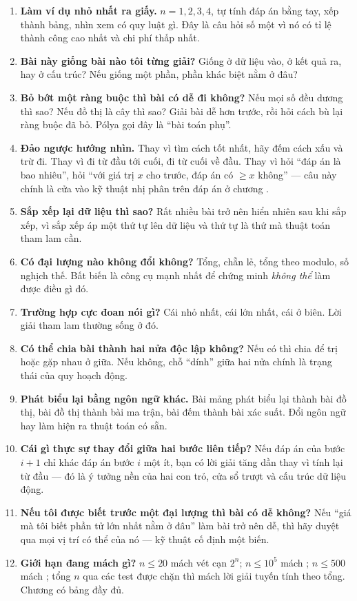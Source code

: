 \documentclass[../../algorithm.tex]{subfiles}
\begin{document}
\begin{enumerate}
\item \textbf{Làm ví dụ nhỏ nhất ra giấy.} \(n=1,2,3,4\), tự tính đáp án bằng tay, xếp thành bảng, nhìn xem có quy luật gì. Đây là câu hỏi số một vì nó có tỉ lệ thành công cao nhất và chi phí thấp nhất.
\item \textbf{Bài này giống bài nào tôi từng giải?} Giống ở dữ liệu vào, ở kết quả ra, hay ở cấu trúc? Nếu giống một phần, phần khác biệt nằm ở đâu?
\item \textbf{Bỏ bớt một ràng buộc thì bài có dễ đi không?} Nếu mọi số đều dương thì sao? Nếu đồ thị là cây thì sao? Giải bài dễ hơn trước, rồi hỏi cách bù lại ràng buộc đã bỏ. Pólya gọi đây là ``bài toán phụ''.
\item \textbf{Đảo ngược hướng nhìn.} Thay vì tìm cách tốt nhất, hãy đếm cách xấu và trừ đi. Thay vì đi từ đầu tới cuối, đi từ cuối về đầu. Thay vì hỏi ``đáp án là bao nhiêu'', hỏi ``với giá trị \(x\) cho trước, đáp án có \(\ge x\) không'' --- câu này chính là cửa vào kỹ thuật nhị phân trên đáp án ở chương .
\item \textbf{Sắp xếp lại dữ liệu thì sao?} Rất nhiều bài trở nên hiển nhiên sau khi sắp xếp, vì sắp xếp áp một thứ tự lên dữ liệu và thứ tự là thứ mà thuật toán tham lam cần.
\item \textbf{Có đại lượng nào không đổi không?} Tổng, chẵn lẻ, tổng theo modulo, số nghịch thế. Bất biến là công cụ mạnh nhất để chứng minh \emph{không thể} làm được điều gì đó.
\item \textbf{Trường hợp cực đoan nói gì?} Cái nhỏ nhất, cái lớn nhất, cái ở biên. Lời giải tham lam thường sống ở đó.
\item \textbf{Có thể chia bài thành hai nửa độc lập không?} Nếu có thì chia để trị hoặc gặp nhau ở giữa. Nếu không, chỗ ``dính'' giữa hai nửa chính là trạng thái của quy hoạch động.
\item \textbf{Phát biểu lại bằng ngôn ngữ khác.} Bài mảng phát biểu lại thành bài đồ thị, bài đồ thị thành bài ma trận, bài đếm thành bài xác suất. Đổi ngôn ngữ hay làm hiện ra thuật toán có sẵn.
\item \textbf{Cái gì thực sự thay đổi giữa hai bước liên tiếp?} Nếu đáp án của bước \(i+1\) chỉ khác đáp án bước \(i\) một ít, bạn có lời giải tăng dần thay vì tính lại từ đầu --- đó là ý tưởng nền của hai con trỏ, cửa sổ trượt và cấu trúc dữ liệu động.
\item \textbf{Nếu tôi được biết trước một đại lượng thì bài có dễ không?} Nếu ``giá mà tôi biết phần tử lớn nhất nằm ở đâu'' làm bài trở nên dễ, thì hãy duyệt qua mọi vị trí có thể của nó --- kỹ thuật cố định một biến.
\item \textbf{Giới hạn đang mách gì?} \(n \le 20\) mách vét cạn \(2^n\); \(n \le 10^5\) mách ; \(n \le 500\) mách ; tổng \(n\) qua các test được chặn thì mách lời giải tuyến tính theo tổng. Chương  có bảng đầy đủ.
\end{enumerate}
\end{document}
